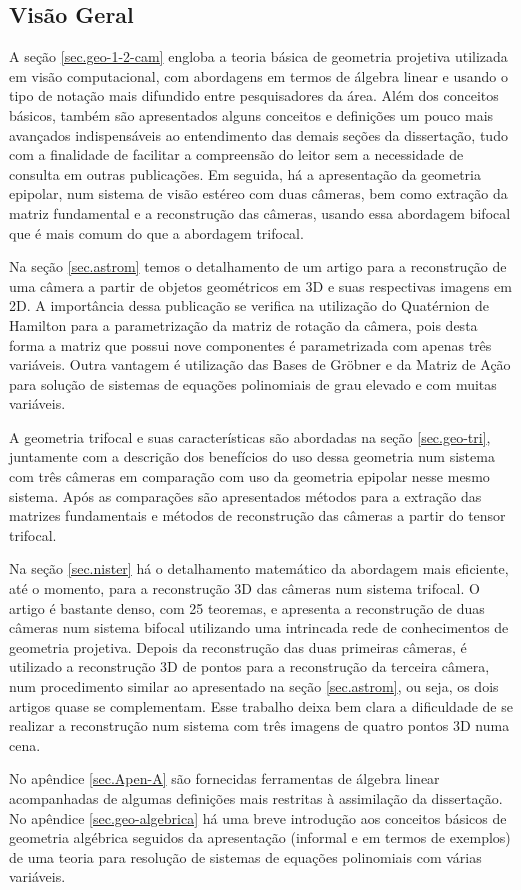 \subsection{Visão Geral}

A seção \ref{sec.geo-1-2-cam} engloba a teoria básica de geometria projetiva utilizada em visão computacional, com abordagens em termos de álgebra linear e usando o tipo de notação mais difundido entre pesquisadores da área. Além dos conceitos básicos, também são apresentados alguns conceitos e definições um pouco mais avançados indispensáveis ao entendimento das demais seções da dissertação, tudo com a finalidade de facilitar a compreensão do leitor sem a necessidade de consulta em outras publicações. Em seguida, há a apresentação da geometria epipolar, num sistema de visão estéreo com duas câmeras, bem como extração da matriz fundamental e a reconstrução das câmeras, usando essa abordagem bifocal que é mais comum do que a abordagem trifocal.

Na seção \ref{sec.astrom} temos o detalhamento de um artigo para a reconstrução de uma câmera a partir de objetos geométricos em 3D e suas respectivas imagens em 2D. A importância dessa publicação se verifica na utilização do Quatérnion de Hamilton para a parametrização da matriz de rotação da câmera, pois desta forma a matriz que possui nove componentes é parametrizada com apenas três variáveis. Outra vantagem é utilização das Bases de Gr\"obner e da Matriz de Ação para solução de sistemas de equações polinomiais de grau elevado e com muitas variáveis.

A geometria trifocal e suas características são abordadas na seção \ref{sec.geo-tri}, juntamente com a descrição dos benefícios do uso dessa geometria num sistema com três câmeras em comparação com uso da geometria epipolar nesse mesmo sistema. Após as comparações são apresentados métodos para a extração das matrizes fundamentais e métodos de reconstrução das câmeras a partir do tensor trifocal.  

Na seção \ref{sec.nister} há o detalhamento matemático da abordagem mais eficiente, até o momento, para a reconstrução 3D das câmeras num sistema trifocal. O artigo é bastante denso, com 25 teoremas, e apresenta a reconstrução de duas câmeras num sistema bifocal utilizando uma intrincada rede de conhecimentos de geometria projetiva. Depois da reconstrução das duas primeiras câmeras, é utilizado a reconstrução 3D de pontos para a reconstrução da terceira câmera, num procedimento similar ao apresentado na seção \ref{sec.astrom}, ou seja, os dois artigos quase se complementam. Esse trabalho deixa bem clara a dificuldade de se realizar a reconstrução num sistema com três imagens de quatro pontos 3D numa cena.

No apêndice \ref{sec.Apen-A} são fornecidas ferramentas de álgebra linear acompanhadas de algumas definições mais restritas à assimilação da dissertação. No apêndice \ref{sec.geo-algebrica} há uma breve introdução aos conceitos básicos de geometria algébrica seguidos da apresentação (informal e em termos de exemplos) de uma teoria para resolução de sistemas de equações polinomiais com várias variáveis.

